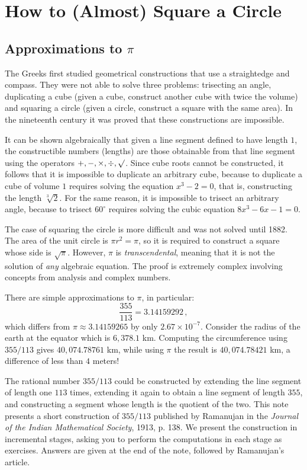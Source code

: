 
\chapter{How to (Almost) Square a Circle}

\section{Approximations to $\pi$}

The Greeks first studied geometrical constructions that use a straightedge and compass. They were not able to solve three problems: trisecting an angle, duplicating a cube (given a cube, construct another cube with twice the volume) and squaring a circle (given a circle, construct a square with the same area). In the nineteenth century it was proved that these constructions are impossible.

It can be shown algebraically that given a line segment defined to have length $1$, the constructible numbers (lengths) are those obtainable from that line segment using the operators $+,-,\times,\div,\surd$. Since cube roots cannot be constructed, it follows that it is impossible to duplicate an arbitrary cube, because to duplicate a cube of volume $1$ requires solving the equation $x^3-2=0$, that is, constructing the length $\sqrt[3]{2}$. For the same reason, it is impossible to trisect an arbitrary angle, because to trisect $60^\circ$ requires solving the cubic equation $8x^3-6x-1=0$.

The case of squaring the circle is more difficult and was not solved until 1882. The area of the unit circle is $\pi r^2=\pi$, so it is required to construct a square whose side is $\sqrt{\pi}$. However, $\pi$ is \emph{transcendental}, meaning that it is not the solution of \emph{any} algebraic equation. The proof is extremely complex involving concepts from analysis and complex numbers.

There are simple approximations to $\pi$, in particular:
\[
\frac{355}{113}=3.14159292\,,
\]
which differs from $\pi\approx 3.14159265$ by only $2.67\times 10^{-7}$. Consider the radius of the earth at the equator which is $6,378.1$ km. Computing the circumference using $355/113$ gives $40,074.78761$ km, while using $\pi$ the result is $40,074.78421$ km, a difference of less than $4$ meters!

The rational number $355/113$ could be constructed by extending the line segment of length one $113$ times, extending it again to obtain a line segment of length $355$, and constructing a segment whose length is the quotient of  the two. This note presents a short construction of $355/113$ published by Ramanujan in the \emph{Journal of the Indian Mathematical Society}, 1913, p. 138. We present the construction in incremental stages, asking you to perform the computations in each stage as exercises. Answers are given at the end of the note, followed by Ramanujan's article.

